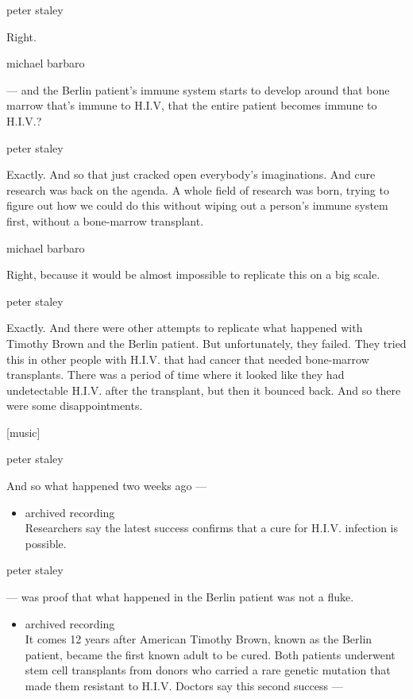 peter staley

Right.

michael barbaro

--- and the Berlin patient's immune system starts to develop around that
bone marrow that's immune to H.I.V, that the entire patient becomes
immune to H.I.V.?

peter staley

Exactly. And so that just cracked open everybody's imaginations. And
cure research was back on the agenda. A whole field of research was
born, trying to figure out how we could do this without wiping out a
person's immune system first, without a bone-marrow transplant.

michael barbaro

Right, because it would be almost impossible to replicate this on a big
scale.

peter staley

Exactly. And there were other attempts to replicate what happened with
Timothy Brown and the Berlin patient. But unfortunately, they failed.
They tried this in other people with H.I.V. that had cancer that needed
bone-marrow transplants. There was a period of time where it looked like
they had undetectable H.I.V. after the transplant, but then it bounced
back. And so there were some disappointments.

{[}music{]}

peter staley

And so what happened two weeks ago ---

\begin{itemize}
\tightlist
\item
  archived recording\\
  Researchers say the latest success confirms that a cure for H.I.V.
  infection is possible.
\end{itemize}

peter staley

--- was proof that what happened in the Berlin patient was not a fluke.

\begin{itemize}
\tightlist
\item
  archived recording\\
  It comes 12 years after American Timothy Brown, known as the Berlin
  patient, became the first known adult to be cured. Both patients
  underwent stem cell transplants from donors who carried a rare genetic
  mutation that made them resistant to H.I.V. Doctors say this second
  success ---
\end{itemize}

